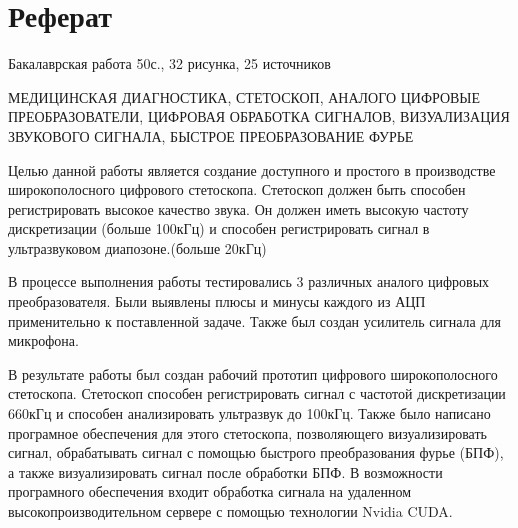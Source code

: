 \documentclass[../main.tex]{subfiles}
\begin{document}
\newpage
\section*{\centering Реферат}

\par\noindent Бакалаврская работа 50с., 32 рисунка, 25 источников

МЕДИЦИНСКАЯ ДИАГНОСТИКА, СТЕТОСКОП, АНАЛОГО ЦИФРОВЫЕ ПРЕОБРАЗОВАТЕЛИ, ЦИФРОВАЯ ОБРАБОТКА СИГНАЛОВ, ВИЗУАЛИЗАЦИЯ ЗВУКОВОГО СИГНАЛА, БЫСТРОЕ ПРЕОБРАЗОВАНИЕ ФУРЬЕ

Целью данной работы является создание доступного и простого в производстве широкополосного цифрового стетоскопа. Стетоскоп должен быть способен регистрировать высокое качество звука. Он должен иметь высокую частоту дискретизации (больше 100кГц) и способен регистрировать сигнал в ультразвуковом диапозоне.(больше 20кГц)

В процессе выполнения работы тестировались 3 различных аналого цифровых преобразователя. Были выявлены плюсы и минусы каждого из АЦП применительно к поставленной задаче. Также был создан усилитель сигнала для микрофона.

В результате работы был создан рабочий прототип цифрового широкополосного стетоскопа. Стетоскоп способен регистрировать сигнал с частотой дискретизации 660кГц и способен анализировать ультразвук до 100кГц. Также было написано програмное обеспечения для этого стетоскопа, позволяющего визуализировать сигнал, обрабатывать сигнал с помощью быстрого преобразования фурье (БПФ), а также визуализировать сигнал после обработки БПФ. В возможности програмного обеспечения входит обработка сигнала на удаленном высокопроизводительном сервере с помощью технологии Nvidia CUDA.

\clearpage
\normalsize
\newpage
\end{document}
